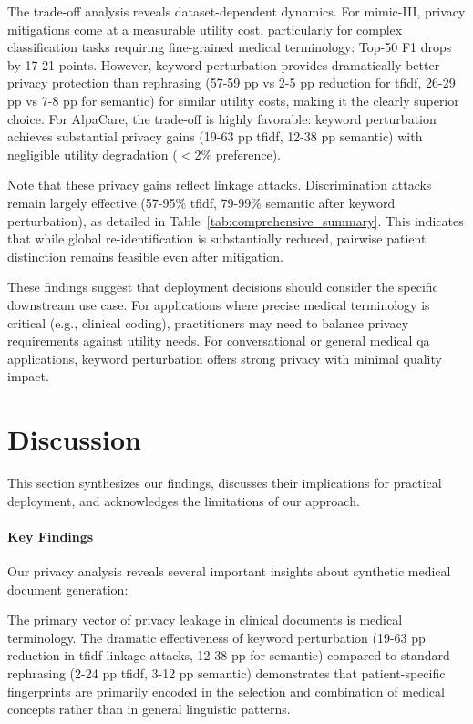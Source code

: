 The trade-off analysis reveals dataset-dependent dynamics. For \gls{mimic}-III, privacy mitigations come at a measurable utility cost, particularly for complex classification tasks requiring fine-grained medical terminology: Top-50 F1 drops by 17-21 points. However, keyword perturbation provides dramatically better privacy protection than rephrasing (57-59 pp vs 2-5 pp reduction for \gls{tfidf}, 26-29 pp vs 7-8 pp for semantic) for similar utility costs, making it the clearly superior choice. For AlpaCare, the trade-off is highly favorable: keyword perturbation achieves substantial privacy gains (19-63 pp \gls{tfidf}, 12-38 pp semantic) with negligible utility degradation ($<$2\% preference).

Note that these privacy gains reflect linkage attacks. Discrimination attacks remain largely effective (57-95\% \gls{tfidf}, 79-99\% semantic after keyword perturbation), as detailed in Table~\ref{tab:comprehensive_summary}. This indicates that while global re-identification is substantially reduced, pairwise patient distinction remains feasible even after mitigation.

These findings suggest that deployment decisions should consider the specific downstream use case. For applications where precise medical terminology is critical (e.g., clinical coding), practitioners may need to balance privacy requirements against utility needs. For conversational or general medical \gls{qa} applications, keyword perturbation offers strong privacy with minimal quality impact.

\section{Discussion}
\label{sec:privacy_discussion}

This section synthesizes our findings, discusses their implications for practical deployment, and acknowledges the limitations of our approach.

\paragraph{Key Findings}

Our privacy analysis reveals several important insights about synthetic medical document generation:

The primary vector of privacy leakage in clinical documents is medical terminology. The dramatic effectiveness of keyword perturbation (19-63 pp reduction in \gls{tfidf} linkage attacks, 12-38 pp for semantic) compared to standard rephrasing (2-24 pp \gls{tfidf}, 3-12 pp semantic) demonstrates that patient-specific fingerprints are primarily encoded in the selection and combination of medical concepts rather than in general linguistic patterns.

